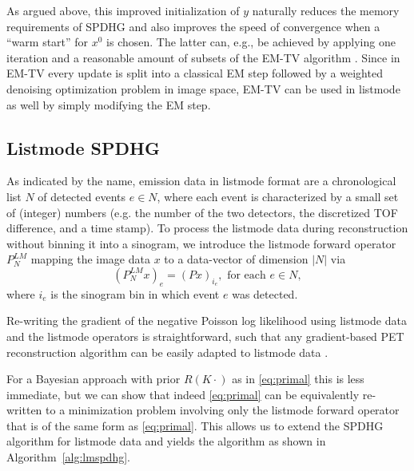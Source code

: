 As argued above, this improved initialization of $y$ naturally reduces the 
memory requirements of SPDHG and also improves the speed of convergence when a
``warm start'' for $x^0$ is chosen. 
The latter can, e.g., be achieved by applying one iteration
and a reasonable amount of subsets of the EM-TV algorithm \cite{Sawatzky2008, Burger2008}.
Since in EM-TV every update is split into a classical EM step followed by a weighted denoising
optimization problem in image space, EM-TV can be used in listmode as well by simply
modifying the EM step.

\subsection*{Listmode SPDHG}

As indicated by the name, emission data in listmode format are a chronological list $N$ of detected 
events $e \in N$, where each event is characterized by a small set of (integer) numbers 
(e.g. the number of the two detectors, the discretized TOF difference, and a time stamp).
To process the listmode data during reconstruction without binning it into a sinogram,
we introduce the listmode forward operator $P^{LM}_N$ mapping the image data $x$ to a 
data-vector of dimension $|N|$ via 
%
\begin{equation}
(P^{LM}_N x)_e  = (Px)_{i_e} , \text{ for each }e \in N,
\label{eq:lmop}
\end{equation}
%
where $i_e$ is the sinogram bin in which event $e$ was detected. 

Re-writing the gradient of the negative Poisson log likelihood using listmode data and the
listmode operators is straightforward, such that any gradient-based PET reconstruction algorithm 
can be easily adapted to listmode data .

For a Bayesian approach with prior $R(K \cdot)$ as in \eqref{eq:primal} this is less immediate, 
but we can show that indeed \eqref{eq:primal} can be equivalently re-written to a minimization 
problem involving only the listmode forward operator that is of the same form as \eqref{eq:primal}. 
This allows us to extend the SPDHG algorithm for listmode data and yields the algorithm as shown 
in Algorithm~\ref{alg:lmspdhg}.

